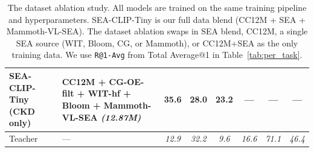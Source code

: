 \documentclass[11pt]{article}
\begin{document}
\begin{table}[h!]
{\begin{tabular}{l l c c c c c c}
SEA-CLIP-Tiny (CKD only)
  & CC12M + CG-OE-filt + WIT-hf + Bloom + Mammoth-VL-SEA \textit{(12.87M)}
  & 35.6 & 28.0 & 23.2 & --- & --- & --- \\
\midrule
Teacher
  & ---
  & \textit{12.9} & \textit{32.2} & \textit{9.6} & \textit{16.6} & \textit{71.1} & \textit{46.4} \\
\bottomrule
\end{tabular}%
}
\caption{The dataset ablation study. All models are trained on the same training pipeline and hyperparameters. SEA-CLIP-Tiny is our full data blend (CC12M + SEA + Mammoth-VL-SEA). The dataset ablation swaps in SEA blend, CC12M, a single SEA source (WIT, Bloom, CG, or Mammoth), or CC12M+SEA as the only training data. We use \texttt{R@1-Avg} from Total Average@1 in Table~\ref{tab:per_task}.}
\label{tab:training}
\vspace{-8mm}
\end{table}
\end{document}
